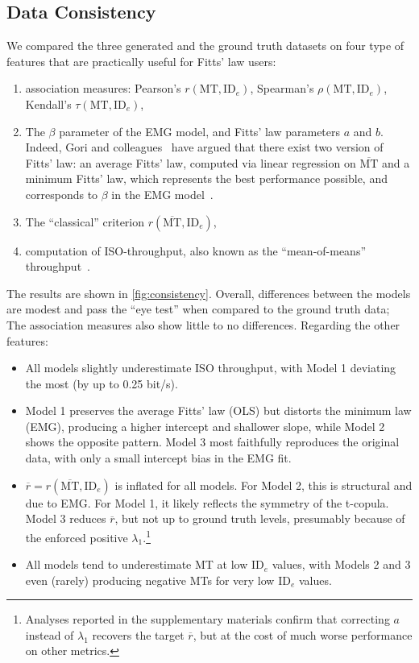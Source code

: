 \documentclass[acmlarge, manuscript,review]{acmart}
\newcommand{\mmt}{\ensuremath{\overline{\mt}}\xspace}
\newcommand{\mt}{\ensuremath{{\text{MT}}}\xspace}
\newcommand{\ide}{\ensuremath{{\text{ID}_e}}\xspace}
\begin{document}
\subsection{Data Consistency \label{subs:consistency}}
We compared the three generated and the ground truth datasets on four type of features that are practically useful for Fitts' law users:

\begin{enumerate}
	\item association measures: Pearson's $r(\mt, \ide)$, Spearman's $\rho(\mt, \ide)$, Kendall's $\tau(\mt, \ide)$,
	\item The $\beta$ parameter of the EMG model, and Fitts' law parameters $a$ and $b$. Indeed, Gori and colleagues~\cite{gori2017,gori2018tochi} have argued that there exist two version of Fitts' law: an average Fitts' law, computed via linear regression on \mmt and a minimum Fitts' law, which represents the best performance possible, and corresponds to $\beta$ in the EMG model~\cite{gori2019}.
	\item The ``classical'' criterion $r(\overline{\mt}, \ide)$,
	\item computation of ISO-throughput, also known as the ``mean-of-means'' throughput~\cite{soukoreff2004}.
\end{enumerate}

The results are shown in \autoref{fig:consistency}. Overall, differences between the models are modest and pass the ``eye test'' when compared to the ground truth data; The association measures also show little to no differences. Regarding the other features:
\begin{itemize}
	\item All models slightly underestimate ISO throughput, with Model 1 deviating the most (by up to 0.25 bit/s). 
	\item Model 1 preserves the average Fitts' law (OLS) but distorts the minimum law (EMG), producing a higher intercept and shallower slope, while Model 2 shows the opposite pattern. Model 3 most faithfully reproduces the original data, with only a small intercept bias in the EMG fit.
	\item $\overline{r} = r(\mmt, \ide)$ is inflated for all models. For Model 2, this is structural and due to EMG. For Model 1, it likely reflects the symmetry of the t-copula. Model 3 reduces $\overline{r}$, but not up to ground truth levels, presumably because of the enforced positive $\lambda_1$.\footnote{Analyses reported in the supplementary materials confirm that correcting $a$ instead of $\lambda_1$ recovers the target $\overline{r}$, but at the cost of much worse performance on other metrics.}
	\item All models tend to underestimate MT at low \ide values, with Models 2 and 3 even (rarely) producing negative MTs for very low \ide values.
\end{itemize}
\end{document}

